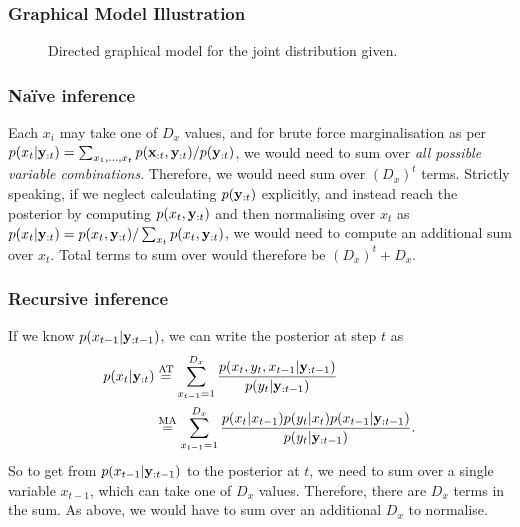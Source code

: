 \documentclass[a4paper]{article}
\theoremstyle{definition}
\begin{document}
\subsubsection{Graphical Model Illustration}
\begin{figure}[h]
\centering
{}
\caption{Directed graphical model for the joint distribution given.}
\label{fig:gm-filtering}
\end{figure}

\subsubsection{Na\"{i}ve inference}
\label{sec:gm-filtering-naive}
Each $x_i$ may take one of $D_x$ values, and for brute force marginalisation as per $
p( x_t | \mathbf{y}_{:t} ) = \sum_{x_1, \ldots, x_t} p( \mathbf{x}_{:t}, \mathbf{y}_{:t} ) / p( \mathbf{y}_{:t} ) $, we would need to sum over \textit{all possible variable combinations}. Therefore, we would need sum over $(D_x)^t$ terms. Strictly speaking, if we neglect calculating $p( \mathbf{y}_{:t} )$ explicitly, and instead reach the posterior by computing $p( x_{t}, \mathbf{y}_{:t} )$ and then normalising over $x_t$ as $p( x_t | \mathbf{y}_{:t} ) = p( x_{t}, \mathbf{y}_{:t} ) / \sum_{x_t} p( x_{t}, \mathbf{y}_{:t} )$, we would need to compute an additional sum over $x_t$. Total terms to sum over would therefore be $(D_x)^t + D_x$.

\subsubsection{Recursive inference}
If we know $p( x_{t-1} | \mathbf{y}_{:t-1} )$, we can write the posterior at step $t$ as
\begin{align}
p(x_t | \mathbf{y}_{:t}) &\stackrel{\text{AT}}{=} \sum_{x_{t-1}=1}^{D_x} \frac{ p( x_t, y_t, x_{t-1} | \mathbf{y}_{:t-1} ) }{ p( y_t | \mathbf{y}_{:t-1} ) } \\
&\stackrel{\text{MA}}{=} \sum_{x_{t-1}=1}^{D_x} \frac{ p( x_t | x_{t-1} ) p( y_t | x_t ) p( x_{t-1} | \mathbf{y}_{:t-1} ) }{ p(y_t | \mathbf{y}_{:t-1} ) }.
\end{align}
So to get from $p( x_{t-1} | \mathbf{y}_{:t-1} )$ to the posterior at $t$, we need to sum over a single variable $x_{t-1}$, which can take one of $D_x$ values. Therefore, there are $D_x$ terms in the sum. As above, we would have to sum over an additional $D_x$ to normalise.
\end{document}
